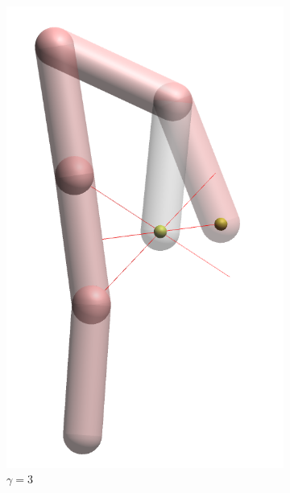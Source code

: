 \begin{figure}[h]
    \centering
    \begin{subfigure}[b]{0.2\textwidth}
        \includegraphics[width=\textwidth]{Figures/simple_distortion_3.png}
        \caption{$\gamma = 3$}
    \end{subfigure}
    ~ %
    \begin{subfigure}[b]{0.2\textwidth}

\end{subfigure}
\end{figure}
